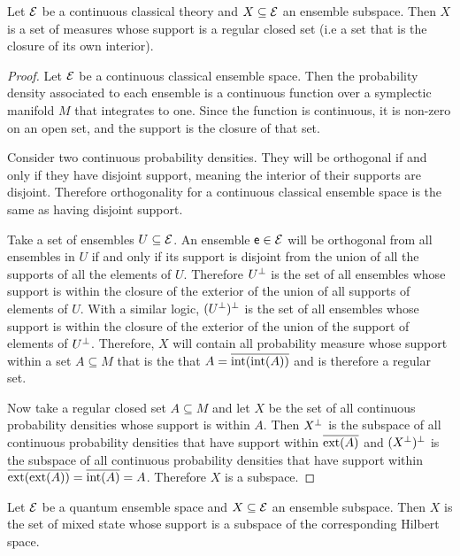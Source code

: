 \begin{prop}
	Let $\mathcal{E}$ be a continuous classical theory and $X \subseteq \mathcal{E}$ an ensemble subspace. Then $X$ is a set of measures whose support is a regular closed set (i.e a set that is the closure of its own interior).
\end{prop}

\begin{proof}
	Let $\mathcal{E}$ be a continuous classical ensemble space. Then the probability density associated to each ensemble is a continuous function over a symplectic manifold $M$ that integrates to one. Since the function is continuous, it is non-zero on an open set, and the support is the closure of that set.
	
	Consider two continuous probability densities. They will be orthogonal if and only if they have disjoint support, meaning the interior of their supports are disjoint. Therefore orthogonality for a continuous classical ensemble space is the same as having disjoint support.
	
	Take a set of ensembles $U \subseteq \mathcal{E}$. An ensemble $\mathsf{e} \in \mathcal{E}$ will be orthogonal from all ensembles in $U$ if and only if its support is disjoint from the union of all the supports of all the elements of $U$. Therefore $U^\perp$ is the set of all ensembles whose support is within the closure of the exterior of the union of all supports of elements of $U$. With a similar logic, $(U^\perp)^\perp$ is the set of all ensembles whose support is within the closure of the exterior of the union of the support of elements of $U^\perp$. Therefore, $X$ will contain all probability measure whose support within a set $A \subseteq M$ that is the that $A = \overline{\operatorname{int}(\operatorname{int}(A))}$ and is therefore a regular set.
	
	Now take a regular closed set $A \subseteq M$ and let $X$ be the set of all continuous probability densities whose support is within $A$. Then $X^\perp$ is the subspace of all continuous probability densities that have support within $\overline{\operatorname{ext}(A)}$ and $(X^\perp)^\perp$ is the subspace of all continuous probability densities that have support within $\overline{\operatorname{ext}(\operatorname{ext}(A))} = \overline{\operatorname{int}(A)} = A$. Therefore $X$ is a subspace.
\end{proof}

\begin{prop}
	Let $\mathcal{E}$ be a quantum ensemble space and $X \subseteq \mathcal{E}$ an ensemble subspace. Then $X$ is the set of mixed state whose support is a subspace of the corresponding Hilbert space.
\end{prop}

